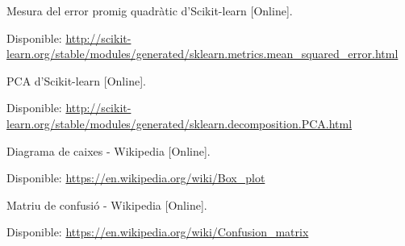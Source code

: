 \documentclass[12pt,a4paper,catalan]{article}
\begin{document}
\begin{thebibliography}{9}
Mesura del error promig quadràtic d'Scikit-learn [Online].

Disponible: \url{http://scikit-learn.org/stable/modules/generated/sklearn.metrics.mean_squared_error.html}


PCA d'Scikit-learn [Online].

Disponible: \url{http://scikit-learn.org/stable/modules/generated/sklearn.decomposition.PCA.html}


Diagrama de caixes - Wikipedia [Online].

Disponible: \url{https://en.wikipedia.org/wiki/Box_plot}


Matriu de confusió - Wikipedia [Online].

Disponible: \url{https://en.wikipedia.org/wiki/Confusion_matrix}


\end{thebibliography}
\end{document}

